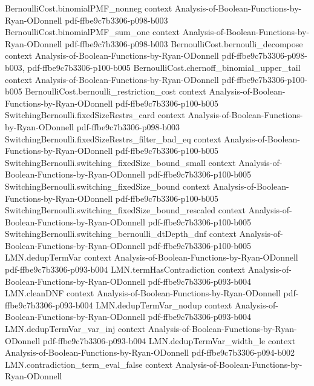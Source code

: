 \begin{lemma}
\proofstep
  {BernoulliCost.binomialPMF_nonneg}
  {context}
  {Analysis-of-Boolean-Functions-by-Ryan-ODonnell}
  {pdf-ffbe9c7b3306-p098-b003}
\proofstep
  {BernoulliCost.binomialPMF_sum_one}
  {context}
  {Analysis-of-Boolean-Functions-by-Ryan-ODonnell}
  {pdf-ffbe9c7b3306-p098-b003}
\proofstep
  {BernoulliCost.bernoulli_decompose}
  {context}
  {Analysis-of-Boolean-Functions-by-Ryan-ODonnell}
  {pdf-ffbe9c7b3306-p098-b003,
    pdf-ffbe9c7b3306-p100-b005}
\proofstep
  {BernoulliCost.chernoff_binomial_upper_tail}
  {context}
  {Analysis-of-Boolean-Functions-by-Ryan-ODonnell}
  {pdf-ffbe9c7b3306-p100-b005}
\proofstep
  {BernoulliCost.bernoulli_restriction_cost}
  {context}
  {Analysis-of-Boolean-Functions-by-Ryan-ODonnell}
  {pdf-ffbe9c7b3306-p100-b005}
\proofstep
  {SwitchingBernoulli.fixedSizeRestrs_card}
  {context}
  {Analysis-of-Boolean-Functions-by-Ryan-ODonnell}
  {pdf-ffbe9c7b3306-p098-b003}
\proofstep
  {SwitchingBernoulli.fixedSizeRestrs_filter_bad_eq}
  {context}
  {Analysis-of-Boolean-Functions-by-Ryan-ODonnell}
  {pdf-ffbe9c7b3306-p100-b005}
\proofstep
  {SwitchingBernoulli.switching_fixedSize_bound_small}
  {context}
  {Analysis-of-Boolean-Functions-by-Ryan-ODonnell}
  {pdf-ffbe9c7b3306-p100-b005}
\proofstep
  {SwitchingBernoulli.switching_fixedSize_bound}
  {context}
  {Analysis-of-Boolean-Functions-by-Ryan-ODonnell}
  {pdf-ffbe9c7b3306-p100-b005}
\proofstep
  {SwitchingBernoulli.switching_fixedSize_bound_rescaled}
  {context}
  {Analysis-of-Boolean-Functions-by-Ryan-ODonnell}
  {pdf-ffbe9c7b3306-p100-b005}
\proofstep
  {SwitchingBernoulli.switching_bernoulli_dtDepth_dnf}
  {context}
  {Analysis-of-Boolean-Functions-by-Ryan-ODonnell}
  {pdf-ffbe9c7b3306-p100-b005}
\proofstep
  {LMN.dedupTermVar}
  {context}
  {Analysis-of-Boolean-Functions-by-Ryan-ODonnell}
  {pdf-ffbe9c7b3306-p093-b004}
\proofstep
  {LMN.termHasContradiction}
  {context}
  {Analysis-of-Boolean-Functions-by-Ryan-ODonnell}
  {pdf-ffbe9c7b3306-p093-b004}
\proofstep
  {LMN.cleanDNF}
  {context}
  {Analysis-of-Boolean-Functions-by-Ryan-ODonnell}
  {pdf-ffbe9c7b3306-p093-b004}
\proofstep
  {LMN.dedupTermVar_nodup}
  {context}
  {Analysis-of-Boolean-Functions-by-Ryan-ODonnell}
  {pdf-ffbe9c7b3306-p093-b004}
\proofstep
  {LMN.dedupTermVar_var_inj}
  {context}
  {Analysis-of-Boolean-Functions-by-Ryan-ODonnell}
  {pdf-ffbe9c7b3306-p093-b004}
\proofstep
  {LMN.dedupTermVar_width_le}
  {context}
  {Analysis-of-Boolean-Functions-by-Ryan-ODonnell}
  {pdf-ffbe9c7b3306-p094-b002}
\proofstep
  {LMN.contradiction_term_eval_false}
  {context}
  {Analysis-of-Boolean-Functions-by-Ryan-ODonnell}

\end{lemma}
